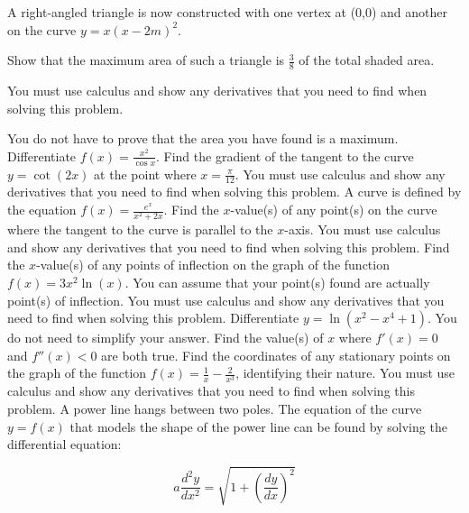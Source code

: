 \documentclass[12pt,addpoints]{exam}
\begin{document}
\begin{questions}
A right-angled triangle is now constructed with one vertex at (0,0) and another on the curve \( y = x(x - 2m)^2 \).

Show that the maximum area of such a triangle is \( \frac{3}{8} \) of the total shaded area.

You must use calculus and show any derivatives that you need to find when solving this problem.

You do not have to prove that the area you have found is a maximum.
\fillwithlines{5cm}
\question[5] Differentiate \( f(x) = \frac{x^2}{\cos x} \).
\fillwithlines{5cm}
\question[5] Find the gradient of the tangent to the curve \( y = \cot(2x) \) at the point where \( x = \frac{\pi}{12} \). You must use calculus and show any derivatives that you need to find when solving this problem.
\fillwithlines{5cm}
\question[5] A curve is defined by the equation \( f(x) = \frac{e^x}{x^2 + 2x} \). Find the \( x \)-value(s) of any point(s) on the curve where the tangent to the curve is parallel to the \( x \)-axis. You must use calculus and show any derivatives that you need to find when solving this problem.
\fillwithlines{5cm}
\question[5] Find the \( x \)-value(s) of any points of inflection on the graph of the function \( f(x) = 3x^2 \ln(x) \). You can assume that your point(s) found are actually point(s) of inflection. You must use calculus and show any derivatives that you need to find when solving this problem.
\fillwithlines{5cm}
\question[5] Differentiate \( y = \ln(x^2 - x^4 + 1) \). You do not need to simplify your answer.
\fillwithlines{5cm}
\question[5] Find the value(s) of \( x \) where \( f'(x) = 0 \) and \( f''(x) < 0 \) are both true.
\fillwithlines{5cm}
\question[5] Find the coordinates of any stationary points on the graph of the function \( f(x) = \frac{1}{x} - \frac{2}{x^3} \), identifying their nature. You must use calculus and show any derivatives that you need to find when solving this problem.
\fillwithlines{5cm}
\question[5] A power line hangs between two poles. The equation of the curve \( y = f(x) \) that models the shape of the power line can be found by solving the differential equation:

\[ a \frac{d^2 y}{dx^2} = \sqrt{1 + \left( \frac{dy}{dx} \right)^2} \]


\end{questions}
\end{document}

